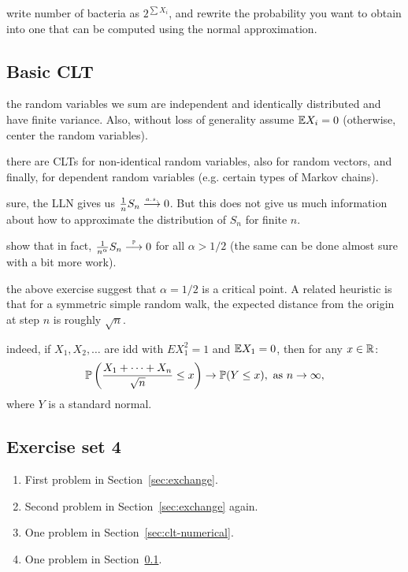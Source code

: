 \documentclass{article}
\begin{document}
 write number of bacteria as $2^{\sum X_i}$, and rewrite the probability you want to obtain into one that can be computed using the normal approximation.


\subsection{Basic CLT}\label{sec:basic-clt}

 the random variables we sum are independent and identically distributed and have finite variance. Also, without loss of generality assume $\E X_i = 0$ (otherwise, center the random variables).

 there are CLTs for non-identical random variables, also for random vectors, and finally, for dependent random variables (e.g. certain types of Markov chains). 

 sure, the LLN gives us $\frac{1}{n} S_n \ascv 0$. But this does not give us much information about how to approximate the distribution of $S_n$ for finite $n$.

 show that in fact, $\frac{1}{n^\alpha} S_n \pcv 0$ for all $\alpha > 1/2$ (the same can be done almost sure with a bit more work). 

 the above exercise suggest that $\alpha = 1/2$ is a critical point. A related heuristic is that for a symmetric simple random walk, the expected distance from the origin at step $n$ is roughly $\sqrt{n}$.

 indeed, if $X_1, X_2, \dots$ are idd with $E X_1^2 = 1$ and $\E X_1 = 0$, then for any $x \in \R$:
\[ \P\left( \frac{X_1 + \dots + X_n}{\sqrt{n}} \le x\right) \to \P(Y \le x), \text{ as }n\to\infty, \]
where $Y$ is a standard normal.

\subsection{Exercise set 4}

\begin{enumerate}	
	\item First problem in Section~\ref{sec:exchange}.
	\item Second problem in Section~\ref{sec:exchange} again.
	\item One problem in Section~\ref{sec:clt-numerical}.
	\item One problem in Section~\ref{sec:basic-clt}.
\end{enumerate}
\end{document}
